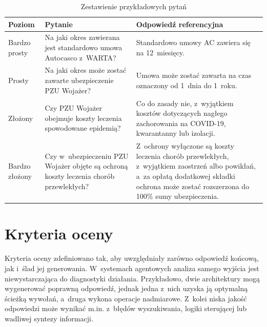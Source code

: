 \begin{table}[H]
  \caption{Zestawienie przykładowych pytań}\label{tab:zestawienie-przykladowych-pytan}
  \centering
  \small
  \begin{adjustbox}{max width=0.94\textwidth}
    \begin{tabularx}{0.94\textwidth}{@{} p{2.4cm} L L @{}}
      \toprule
      \textbf{Poziom}
      & \textbf{Pytanie}
      & \textbf{Odpowiedź referencyjna}                                   \\
      \midrule
      Bardzo prosty
      & Na jaki okres zawierana jest standardowo umowa Autocasco z~WARTA?
      & Standardowo umowy AC zawiera się na 12~miesięcy.                  \\
      \addlinespace
      Prosty
      & Na jaki okres może zostać zawarte ubezpieczenie PZU Wojażer?
      & Umowa może zostać zawarta na czas oznaczony od 1~dnia do 1~roku.  \\
      \addlinespace
      Złożony
      & Czy PZU Wojażer obejmuje koszty leczenia spowodowane epidemią?
      & Co do zasady nie, z~wyjątkiem kosztów dotyczących nagłego
      zachorowania na COVID-19, kwarantanny lub izolacji.                  \\
      \addlinespace
      Bardzo złożony
      & Czy w~ubezpieczeniu PZU Wojażer objęte są ochroną koszty
      leczenia chorób przewlekłych?
      & Z~ochrony wyłączone są koszty leczenia chorób przewlekłych,
      z~wyjątkiem zaostrzeń albo powikłań, a~za opłatą dodatkowej
      składki ochrona może zostać rozszerzona do 100\% sumy
      ubezpieczenia.                                                       \\
      \bottomrule
    \end{tabularx}
  \end{adjustbox}
\end{table}

\section{Kryteria oceny}\label{sec:kryteria-oceny}

Kryteria oceny zdefiniowano tak, aby uwzględniały zarówno odpowiedź końcową,
jak i~ślad jej generowania. W~systemach agentowych analiza samego wyjścia jest
niewystarczająca do diagnostyki działania. Przykładowo, dwie architektury mogą
wygenerować poprawną odpowiedź, jednak jedna z~nich uzyska ją optymalną ścieżką
wywołań, a~druga wykona operacje nadmiarowe. Z~kolei niska jakość odpowiedzi
może wynikać m.in. z~błędów wyszukiwania, logiki sterującej lub wadliwej
syntezy informacji.

